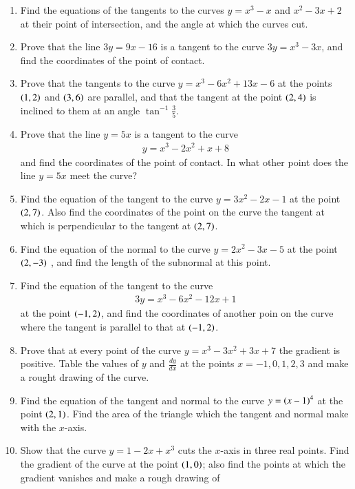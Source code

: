 \renewcommand{\theequation}{\theenumi}
\begin{enumerate}[label=\arabic*.,ref=\thesubsection.\theenumi]
\item Find the equations of the tangents to the curves $y=x^3-x$ and $x^2-3x+2$ at their point of intersection, and the angle at which the
curves cut.
\item Prove that the line $3y=9x-16$ is a tangent to the curve $3y=x^3-3x$, and find the coordinates of the 
point of contact.
\item Prove that the tangents to the curve $y=x^3-6x^2+13x-6$ at the points $\left(1,2\right)$ and $\left(3,6\right)$ are parallel, and that
the tangent at the point $\left(2,4\right)$ is inclined to them at an angle $\tan^{-1}\frac{3}{5}$.
\item Prove that the line $y=5x$ is a tangent to the curve
\begin{align*}
y=x^3-2x^2+x+8
\end{align*}
and find the coordinates of the point of contact.  In what other point does the line $y=5x$ meet the curve?
\item Find the equation of the tangent to the curve $y=3x^2-2x-1$ at the point $\left(2,7\right)$.  Also find the coordinates of the point on the curve the tangent
at which is perpendicular to the tangent at $\left(2,7\right)$.
\item Find the equation of the normal to the curve $y=2x^2-3x-5$ at the point $\left(2,-3\right)$ , and find the length of the subnormal at this point.
\item Find the equation of the tangent to the curve
\begin{align*}
3y=x^3-6x^2-12x+1
\end{align*}
at the point $\left(-1,2\right)$, and find the coordinates of another poin on the curve where the tangent
is parallel to that at $\left(-1,2\right)$.
\item Prove that at every point of the curve $y=x^3-3x^2+3x+7$ the gradient is positive.  Table the values of $y$ and $\frac{dy}{dx}$ at the points
$x=-1,0,1,2,3$ and make a rought drawing of the curve.
\item Find the equation of the tangent and normal to the curve $y=\left(x-1\right)^4$ at the point $\left(2,1\right)$.  Find the area of the triangle
which the tangent and normal make with the $x$-axis.
\item Show that the curve $y=1-2x+x^3$ cuts the $x$-axis in three real points.  Find the gradient of the curve
at the point $\left(1,0\right)$; also find the points at which the gradient vanishes and make a rough drawing of 

\end{enumerate}

